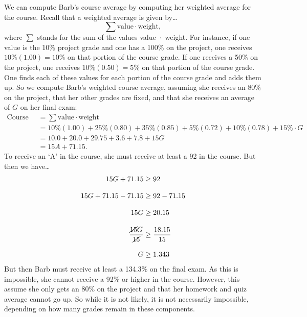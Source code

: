 \documentclass[11pt,letterpaper]{article}
\begin{document}
\sol We can compute Barb's course average by computing her weighted average for the course. Recall that a weighted average is given by\dots 
	\[
	\sum \text{value} \cdot \text{weight},
	\] 
where $\sum$ stands for the sum of the values value~$\cdot$~weight. For instance, if one value is the 10\% project grade and one has a 100\% on the project, one receives $10\%(1.00)= 10\%$ on that portion of the course grade. If one receives a 50\% on the project, one receives $10\%(0.50)= 5\%$ on that portion of the course grade. One finds each of these values for each portion of the course grade and adds them up. So we compute Barb's weighted course average, assuming she receives an 80\% on the project, that her other grades are fixed, and that she receives an average of $G$ on her final exam: 
	\[
	\begin{aligned}
	\text{Course Average}&= \sum \text{value} \cdot \text{weight} \\[0.3cm]
	&= 10\% (1.00) + 25\% (0.80) + 35\% (0.85) + 5\% (0.72) + 10\% (0.78) + 15\% \cdot G \\[0.3cm]
	&= 10.0 + 20.0 + 29.75 + 3.6 + 7.8 + 15G \\[0.3cm]
	&= 15A + 71.15.
	\end{aligned}
	\] 
To receive an `A' in the course, she must receive at least a 92 in the course. But then we have\dots
	\[
	\begin{aligned}
	15G + 71.15&\geq 92 \\[0.3cm]
	15G + 71.15 - 71.15&\geq 92 - 71.15 \\[0.3cm]
	15G&\geq 20.15 \\[0.3cm]
	\dfrac{\cancel{15}G}{\cancel{15}}&\geq \dfrac{18.15}{15} \\[0.3cm]
	G&\geq 1.343
	\end{aligned}
	\]
But then Barb must receive at least a 134.3\% on the final exam. As this is impossible, she cannot receive a 92\% or higher in the course. However, this assume she only gets an 80\% on the project and that her homework and quiz average cannot go up. So while it is not likely, it is not necessarily impossible, depending on how many grades remain in these components. 




\newpage
\end{document}
